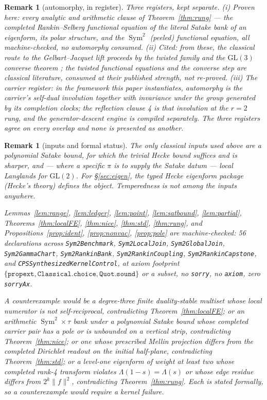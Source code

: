 \documentclass[11pt]{article}
\newtheorem{remark}[theorem]{Remark}
\newcommand{\Sym}{\operatorname{Sym}}
\begin{document}
\begin{remark}[automorphy, in register]\label{rem:auto}
Three registers, kept separate.  \emph{(i) Proven here:} every analytic and arithmetic clause of
Theorem~\ref{thm:rung} --- the completed Rankin--Selberg functional equation of the literal
Satake bank of an eigenform, its polar structure, and the $\Sym^2$ (peeled) functional
equation, all machine-checked, no automorphy consumed.  \emph{(ii) Cited:} from these, the
classical route to the Gelbart--Jacquet lift \cite{GJ} proceeds by the twisted family and the
$\mathrm{GL}(3)$ converse theorem \cite{JPSS}; the twisted functional equations and the
converse step are classical literature, consumed at their published strength, not re-proved.
\emph{(iii) The carrier register:} in the framework this paper instantiates, automorphy is the
carrier's self-dual involution together with invariance under the group generated by its
completion clocks; the reflection clause 4 \emph{is} that involution at the $r=2$ rung, and the
generator-descent engine is compiled separately.  The three registers agree on every overlap
and none is presented as another.
\end{remark}

\begin{remark}[inputs and formal status]
The only classical inputs used above are a polynomial Satake bound, for which the trivial Hecke
bound suffices and \cite{JS} is sharper, and --- where a specific $\pi$ is to supply the Satake
datum --- local Langlands for $\mathrm{GL}(2)$.  For \S\ref{sec:eigen}, the typed Hecke
eigenform package (Hecke's theory) defines the object.  Temperedness is not among the inputs
anywhere.

Lemmas~\ref{lem:range}, \ref{lem:ledger}, \ref{lem:point}, \ref{lem:satbound},
\ref{lem:partial}, Theorems~\ref{thm:localFE}, \ref{thm:nice}, \ref{thm:std}, \ref{thm:rung},
and Propositions~\ref{prop:ident}, \ref{prop:nonvac}, \ref{prop:pole} are machine-checked: 56
declarations across \texttt{Sym2Benchmark}, \texttt{Sym2LocalJoin}, \texttt{Sym2GlobalJoin},
\texttt{Sym2GammaChart}, \texttt{Sym2RankinBank}, \texttt{Sym2RankinCoupling},
\texttt{Sym2RankinCapstone}, and \texttt{CPSSynthesizedKernelControl}, at axiom footprint
$\{\texttt{propext},\texttt{Classical.choice},\texttt{Quot.sound}\}$ or a subset, no
\texttt{sorry}, no \texttt{axiom}, zero \texttt{sorryAx}.

A counterexample would be a degree-three finite duality-stable multiset whose local numerator is
not self-reciprocal, contradicting Theorem~\ref{thm:localFE}; or an arithmetic
$\Sym^2\!\times\tau$ bank under a polynomial Satake bound whose completed carrier pair has a pole
or is unbounded on a vertical strip, contradicting Theorem~\ref{thm:nice}; or one whose prescribed
Mellin projection differs from the completed Dirichlet readout on the initial half-plane,
contradicting Theorem~\ref{thm:std}; or a level-one eigenform of weight at least two whose
completed rank-4 transform violates $\Lambda(1-s)=\Lambda(s)$ or whose edge residue differs from
$2^{k}\|f\|^2$, contradicting Theorem~\ref{thm:rung}. Each is stated formally, so a
counterexample would require a kernel failure.
\end{remark}
\end{document}

